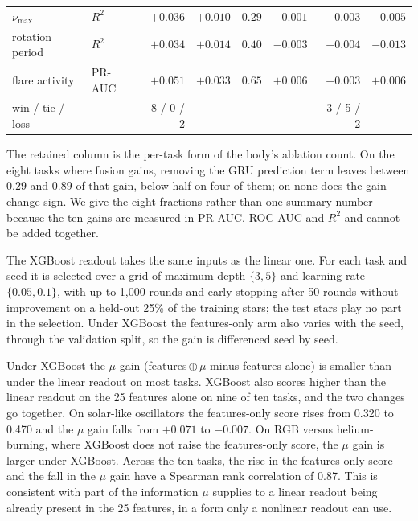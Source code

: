 \documentclass{article}
\begin{document}
\begin{table}[H]
\begin{tabular}{llrrrrrr}
$\nu_{\max}$ & $R^2$ & $\boldsymbol{+}\mathbf{0.036}$ & $\boldsymbol{+}\mathbf{0.010}$ & $0.29$ & ${-}0.001$ & $\boldsymbol{+}\mathbf{0.003}$ & ${-}0.005$ \\
rotation period & $R^2$ & $\boldsymbol{+}\mathbf{0.034}$ & $\boldsymbol{+}\mathbf{0.014}$ & $0.40$ & ${-}0.003$ & $\boldsymbol{-}\mathbf{0.004}$ & ${-}0.013$ \\
flare activity & PR-AUC & $\boldsymbol{+}\mathbf{0.051}$ & $\boldsymbol{+}\mathbf{0.033}$ & $0.65$ & ${+}0.006$ & ${+}0.003$ & ${+}0.006$ \\
\midrule
win / tie / loss & & 8 / 0 / 2 & & & & 3 / 5 / 2 & \\
\bottomrule
\end{tabular}

\end{table}

The retained column is the per-task form of the body's ablation count. On the eight tasks where
fusion gains, removing the GRU prediction term leaves between $0.29$ and $0.89$ of that gain, below
half on four of them; on none does the gain change sign. We give the eight fractions rather
than one summary number because the ten gains are measured in PR-AUC, ROC-AUC and $R^{2}$ and cannot
be added together.

The XGBoost readout takes the same inputs as the linear one. For each task and seed it is selected
over a grid of maximum depth $\{3,5\}$ and learning rate $\{0.05,0.1\}$, with up to 1{,}000 rounds
and early stopping after 50 rounds without improvement on a held-out 25\% of the training stars;
the test stars play no part in the selection. Under XGBoost the features-only arm also varies with
the seed, through the validation split, so the gain is differenced seed by seed.

Under XGBoost the $\mu$ gain (features\,$\oplus\,\mu$ minus features alone) is smaller than under the
linear readout on most tasks. XGBoost also scores higher than the linear readout on the 25 features
alone on nine of ten tasks, and the two changes go together. On solar-like oscillators the features-only score rises from
0.320 to 0.470 and the $\mu$ gain falls from $+0.071$ to $-0.007$. On RGB versus helium-burning,
where XGBoost does not raise the features-only score, the $\mu$ gain is larger under XGBoost. Across
the ten tasks, the rise in the features-only score and the fall in the $\mu$ gain have a Spearman rank
correlation of 0.87. This is consistent with part of the information $\mu$ supplies to a linear
readout being already present in the 25 features, in a form only a nonlinear readout can use.
\end{document}
